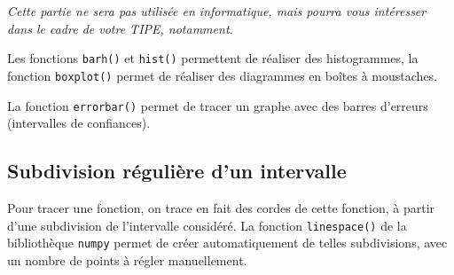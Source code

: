 \emph{Cette partie ne sera pas utilisée en informatique, mais pourra vous intéresser dans le cadre de votre TIPE, notamment.}

Les fonctions \texttt{barh()} et \texttt{hist()} permettent de réaliser des histogrammes, la fonction \texttt{boxplot()} permet de réaliser des diagrammes en boîtes à moustaches.

La fonction \texttt{errorbar()} permet de tracer un graphe avec des barres d'erreurs (intervalles de confiances). 

\subsection{Subdivision régulière d'un intervalle}

Pour tracer une fonction, on trace en fait des cordes de cette fonction, à partir d'une subdivision de l'intervalle considéré. 
La fonction \texttt{linespace()} de la bibliothèque \texttt{numpy} permet de créer automatiquement de telles subdivisions, avec un nombre de points à régler manuellement. 

